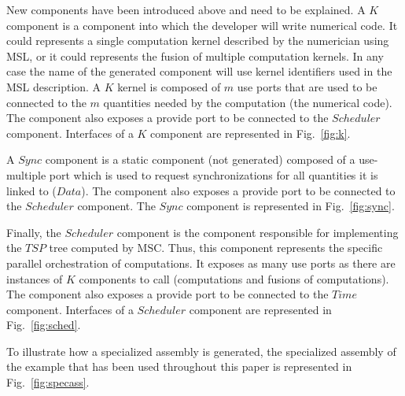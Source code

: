 New components have been introduced above and need to be explained. A $K$ component is a component into which the developer will write numerical code. It could represents a single computation kernel described by the numerician using MSL, or it could represents the fusion of multiple computation kernels. In any case the name of the generated component will use kernel identifiers used in the MSL description. A $K$ kernel is composed of $m$ use ports that are used to be connected to the $m$ quantities needed by the computation (\ie the numerical code). The component also exposes a provide port to be connected to the $Scheduler$ component. Interfaces of a $K$ component are represented in Fig.~\ref{fig:k}.

A $Sync$ component is a static component (not generated) composed of a use-multiple port which is used to request synchronizations for all quantities it is linked to ($Data$). The component also exposes a provide port to be connected to the $Scheduler$ component. The $Sync$ component is represented in Fig.~\ref{fig:sync}.

Finally, the $Scheduler$ component is the component responsible for implementing the $TSP$ tree  computed by MSC. Thus, this component represents the specific parallel orchestration of  computations. It exposes as many use ports as there are instances of $K$ components to call (\ie computations and fusions of computations). The component also exposes a provide port to be connected to the $Time$ component. Interfaces of a $Scheduler$ component are represented in Fig.~\ref{fig:sched}.

To illustrate how a specialized assembly is generated, the specialized assembly of the example that has been used throughout this paper is represented in Fig.~\ref{fig:specass}. 

